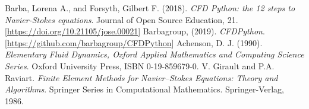 \documentclass[A4,10pt]{article}
\begin{document}
\begin{thebibliography}{99}
	 Barba, Lorena A., and Forsyth, Gilbert F. (2018). \textit{CFD Python: the 12 steps to Navier-Stokes equations}. Journal of Open Source Education, 21. [\href{https://doi.org/10.21105/jose.00021}{https://doi.org/10.21105/jose.00021}]
 Barbagroup, (2019). \textit{CFDPython}. [\href{https://github.com/barbagroup/CFDPython}{https://github.com/barbagroup/CFDPython}]
 Achenson, D. J. (1990). \textit{Elementary Fluid Dynamics, Oxford Applied Mathematics and Computing Science Series}. Oxford University Press, ISBN 0-19-859679-0.
 V. Girault and P.A. Raviart. \textit{Finite Element Methods for Navier–Stokes Equations: Theory and Algorithms}. Springer Series in Computational Mathematics. Springer-Verlag, 1986.
\end{thebibliography}
\end{document}

